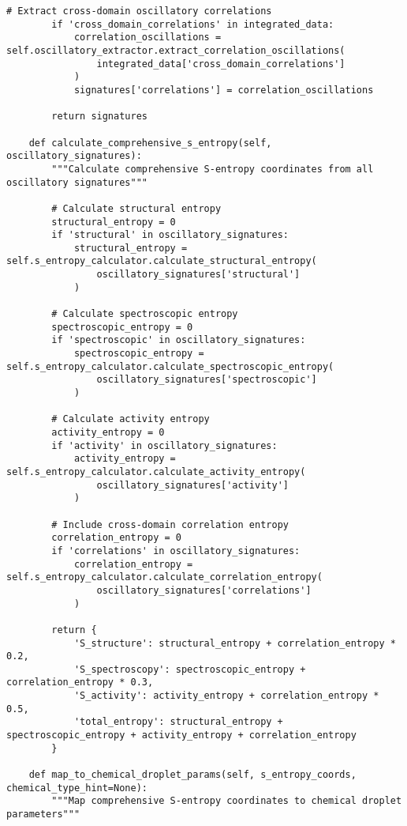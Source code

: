 \documentclass[12pt,a4paper]{article}
\begin{document}
\begin{algorithm}
\begin{algorithmic}[1]
\begin{lstlisting}[style=pythonstyle, caption=Core Molecule-to-Drip Implementation for Comprehensive Chemical Analysis]
        # Extract cross-domain oscillatory correlations
        if 'cross_domain_correlations' in integrated_data:
            correlation_oscillations = self.oscillatory_extractor.extract_correlation_oscillations(
                integrated_data['cross_domain_correlations']
            )
            signatures['correlations'] = correlation_oscillations
        
        return signatures
    
    def calculate_comprehensive_s_entropy(self, oscillatory_signatures):
        """Calculate comprehensive S-entropy coordinates from all oscillatory signatures"""
        
        # Calculate structural entropy
        structural_entropy = 0
        if 'structural' in oscillatory_signatures:
            structural_entropy = self.s_entropy_calculator.calculate_structural_entropy(
                oscillatory_signatures['structural']
            )
        
        # Calculate spectroscopic entropy
        spectroscopic_entropy = 0
        if 'spectroscopic' in oscillatory_signatures:
            spectroscopic_entropy = self.s_entropy_calculator.calculate_spectroscopic_entropy(
                oscillatory_signatures['spectroscopic']
            )
        
        # Calculate activity entropy
        activity_entropy = 0
        if 'activity' in oscillatory_signatures:
            activity_entropy = self.s_entropy_calculator.calculate_activity_entropy(
                oscillatory_signatures['activity']
            )
        
        # Include cross-domain correlation entropy
        correlation_entropy = 0
        if 'correlations' in oscillatory_signatures:
            correlation_entropy = self.s_entropy_calculator.calculate_correlation_entropy(
                oscillatory_signatures['correlations']
            )
        
        return {
            'S_structure': structural_entropy + correlation_entropy * 0.2,
            'S_spectroscopy': spectroscopic_entropy + correlation_entropy * 0.3,
            'S_activity': activity_entropy + correlation_entropy * 0.5,
            'total_entropy': structural_entropy + spectroscopic_entropy + activity_entropy + correlation_entropy
        }
    
    def map_to_chemical_droplet_params(self, s_entropy_coords, chemical_type_hint=None):
        """Map comprehensive S-entropy coordinates to chemical droplet parameters"""
        

\end{lstlisting}
\end{algorithmic}
\end{algorithm}
\end{document}
